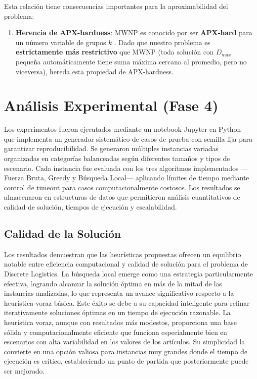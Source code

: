 \documentclass[12pt, a4paper]{article}
\begin{document}
Esta relación tiene consecuencias importantes para la aproximabilidad del problema:

\begin{enumerate}
\item \textbf{Herencia de APX-hardness}: MWNP es conocido por ser \textbf{APX-hard} para un número variable de grupos $k$ . Dado que nuestro problema es \textbf{estrictamente más restrictivo} que MWNP (toda solución con $D_{max}$ pequeña automáticamente tiene suma máxima cercana al promedio, pero no viceversa), hereda esta propiedad de APX-hardness.


\end{enumerate}

    \section{Análisis Experimental (Fase 4)}
    Los experimentos fueron ejecutados mediante un notebook Jupyter en Python que implementa un generador sistemático de casos de prueba con semilla fija para garantizar reproducibilidad. Se generaron múltiples instancias variadas organizadas en categorías balanceadas según diferentes tamaños y tipos de escenario. Cada instancia fue evaluada con los tres algoritmos implementados ---Fuerza Bruta, Greedy y Búsqueda Local--- aplicando límites de tiempo mediante control de timeout para casos computacionalmente costosos. Los resultados se almacenaron en estructuras de datos que permitieron análisis cuantitativos de calidad de solución, tiempos de ejecución y escalabilidad.

    \subsection{Calidad de la Solución}
    Los resultados demuestran que las heurísticas propuestas ofrecen un equilibrio notable entre eficiencia computacional y calidad de solución para el problema de Discrete Logistics. La búsqueda local emerge como una estrategia particularmente efectiva, logrando alcanzar la solución óptima en más de la mitad de las instancias analizadas, lo que representa un avance significativo respecto a la heurística voraz básica. Este éxito se debe a su capacidad inteligente para refinar iterativamente soluciones óptimas en un tiempo de ejecución razonable. La heurística voraz, aunque con resultados más modestos, proporciona una base sólida y computacionalmente eficiente que funciona especialmente bien en escenarios con alta variabilidad en los valores de los artículos. Su simplicidad la convierte en una opción valiosa para instancias muy grandes donde el tiempo de ejecución es crítico, estableciendo un punto de partida que posteriormente puede ser mejorado.
\end{document}
